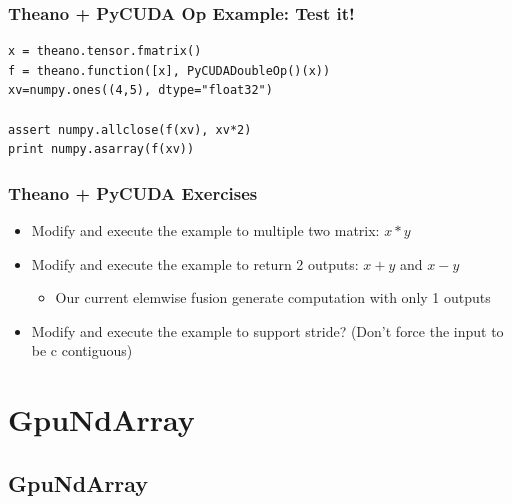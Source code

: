 \documentclass[a4paper,9pt]{beamer}
\begin{document}
\begin{frame}[fragile]
\frametitle{Theano + PyCUDA Op Example: Test it!}
\begin{Verbatim}
x = theano.tensor.fmatrix()
f = theano.function([x], PyCUDADoubleOp()(x))
xv=numpy.ones((4,5), dtype="float32")

assert numpy.allclose(f(xv), xv*2)
print numpy.asarray(f(xv))
\end{Verbatim}
\end{frame}

\begin{frame}
\frametitle{Theano + PyCUDA Exercises}
\begin{itemize}
\item Modify and execute the example to multiple two matrix: $x * y$
\item Modify and execute the example to return 2 outputs: $x + y$ and $x - y$
  \begin{itemize}
  \item Our current elemwise fusion generate computation with only 1 outputs
  \end{itemize}
\item Modify and execute the example to support stride? (Don't force the input to be c contiguous)
\end{itemize}
\end{frame}

\section{GpuNdArray}
\subsection{GpuNdArray}
\end{document}
